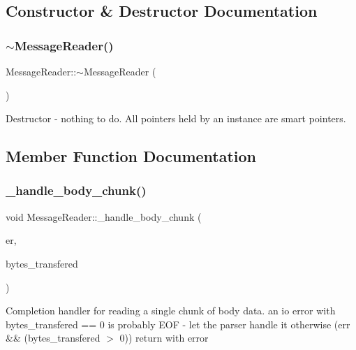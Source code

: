\subsection{Constructor \& Destructor Documentation}
\mbox{\label{class_message_reader_ab5a1832a8447dd11d8d57d8aed44d3a9}} 
\subsubsection{\texorpdfstring{$\sim$\+Message\+Reader()}{~MessageReader()}}
{\footnotesize\ttfamily Message\+Reader\+::$\sim$\+Message\+Reader (\begin{DoxyParamCaption}{ }\end{DoxyParamCaption})}

Destructor -\/ nothing to do. All pointers held by an instance are smart pointers. 

\subsection{Member Function Documentation}
\mbox{\label{class_message_reader_af174bd59d03d7e462f76d137b22863f2}} 
\subsubsection{\texorpdfstring{\+\_\+handle\+\_\+body\+\_\+chunk()}{\_handle\_body\_chunk()}}
{\footnotesize\ttfamily void Message\+Reader\+::\+\_\+handle\+\_\+body\+\_\+chunk (\begin{DoxyParamCaption}\item[{Marvin\+::\+Error\+Type}]{er,  }\item[{std\+::size\+\_\+t}]{bytes\+\_\+transfered }\end{DoxyParamCaption})\hspace{0.3cm}{\ttfamily [protected]}}

Completion handler for reading a single chunk of body data. an io error with bytes\+\_\+transfered == 0 is probably E\+OF -\/ let the parser handle it otherwise (err \&\& (bytes\+\_\+transfered $>$ 0)) return with error\mbox{\label{class_message_reader_a366ff67eab28c15869657c436babf31e}} 

